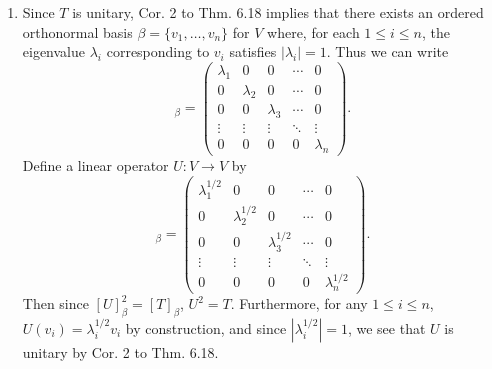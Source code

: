 \documentclass[12pt]{article}
\begin{document}
\begin{enumerate}
\item
Since $T$ is unitary, Cor. 2 to Thm. 6.18 implies that there exists an ordered orthonormal basis $\beta = \{v_1, \dots, v_n\}$ for $V$ where, for each $1 \leq i \leq n$, the eigenvalue $\lambda_i$ corresponding to $v_i$ satisfies $|\lambda_i| = 1$. Thus we can write
\begin{equation*}
[T]_\beta = \begin{pmatrix}
\lambda_1 & 0 & 0 & \cdots & 0 \\
0 & \lambda_2 & 0 & \cdots & 0 \\
0 & 0 & \lambda_3 & \cdots & 0 \\
\vdots & \vdots & \vdots & \ddots & \vdots \\
0 & 0 & 0 & 0 & \lambda_n
\end{pmatrix}.
\end{equation*}
Define a linear operator $U : V \to V$ by
\begin{equation*}
[U]_\beta = \begin{pmatrix}
\lambda_1^{1/2} & 0 & 0 & \cdots & 0 \\
0 & \lambda_2^{1/2} & 0 & \cdots & 0 \\
0 & 0 & \lambda_3^{1/2} & \cdots & 0 \\
\vdots & \vdots & \vdots & \ddots & \vdots \\
0 & 0 & 0 & 0 & \lambda_n^{1/2}
\end{pmatrix}.
\end{equation*}
Then since $[U]_\beta^2 = [T]_\beta$, $U^2 = T$. Furthermore, for any $1 \leq i \leq n$, $U(v_i) = \lambda_i^{1/2} v_i$ by construction, and since $|\lambda_i^{1/2}| = 1$, we see that $U$ is unitary by Cor. 2 to Thm. 6.18.

\end{enumerate}
\end{document}
